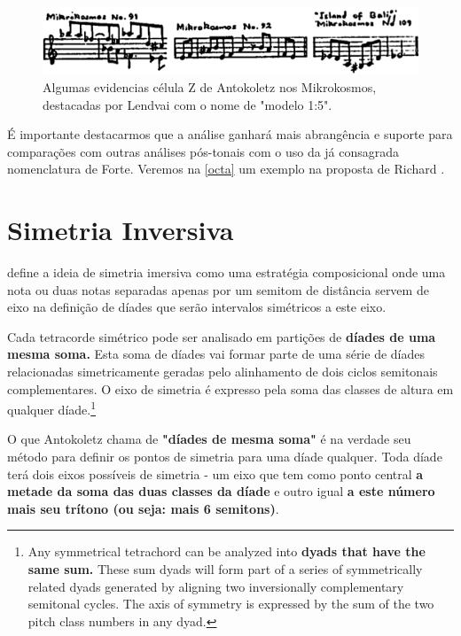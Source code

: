 \documentclass[
	12pt,				%
	openright,			%
	twoside,			%
	a4paper,			%
	english,			%
	french,				%
	spanish,			%
	brazil				%
	]{abntex2}
\begin{document}
\begin{figure}[!h]
	\caption{\label{fig_grafico}Algumas evidencias célula Z de Antokoletz nos Mikrokosmos, destacadas por Lendvai com o nome de "modelo 1:5". }
	\begin{center}
	    \includegraphics[scale=0.4]{intervalar/Lendvai_p52_ZCell.png}
	\end{center}
\end{figure}

É importante destacarmos que a análise ganhará mais abrangência e suporte para comparações com outras análises pós-tonais com o uso da já consagrada nomenclatura de Forte. Veremos na \autoref{octa} um exemplo na proposta de Richard . 
 
\section{Simetria Inversiva}
\label{simetria}

 define a ideia de simetria imersiva como uma estratégia composicional onde uma nota ou duas notas separadas apenas por um semitom de distância servem de eixo na definição de díades que serão intervalos simétricos a este eixo.

\begin{citacao}

Cada tetracorde simétrico pode ser analisado em partições de \textbf{díades de uma mesma soma.} Esta soma de díades vai formar parte de uma série de díades relacionadas simetricamente geradas pelo alinhamento de dois ciclos semitonais complementares. O eixo de simetria é expresso pela soma das classes de altura em qualquer díade.\cite[p. 72]{antokoletz1984music}\footnote{Any symmetrical tetrachord can be analyzed into\textbf{ dyads that have the same sum.} These sum dyads will form part of a series of symmetrically related dyads generated by aligning two inversionally complementary semitonal cycles. The axis of symmetry is expressed by the sum of the two pitch class numbers in any dyad.\cite[p. 72, grifo nosso]{antokoletz1984music}}
\end{citacao}

O que Antokoletz chama de \textbf{"díades de mesma soma"} é na verdade seu método para definir os pontos de simetria para uma díade qualquer. Toda díade terá dois eixos possíveis de simetria - um eixo que tem como ponto central \textbf{a metade da soma das duas classes da díade} e outro igual \textbf{a este número mais seu trítono (ou seja: mais 6 semitons)}. 
\end{document}
